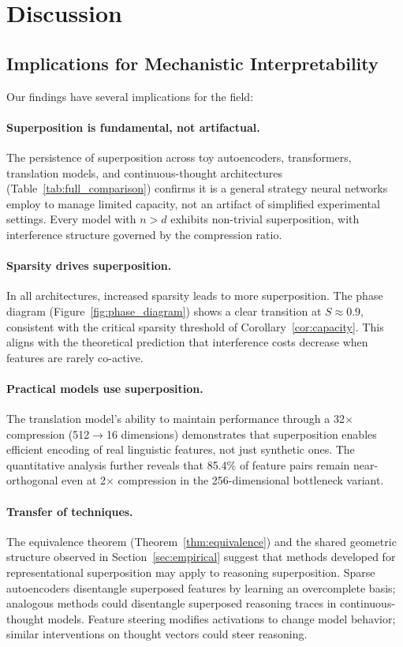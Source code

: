 \section{Discussion}
\label{sec:implications}

\subsection{Implications for Mechanistic Interpretability}

Our findings have several implications for the field:

\paragraph{Superposition is fundamental, not artifactual.} The persistence of superposition across toy autoencoders, transformers, translation models, and continuous-thought architectures (Table~\ref{tab:full_comparison}) confirms it is a general strategy neural networks employ to manage limited capacity, not an artifact of simplified experimental settings. Every model with $n > d$ exhibits non-trivial superposition, with interference structure governed by the compression ratio.

\paragraph{Sparsity drives superposition.} In all architectures, increased sparsity leads to more superposition. The phase diagram (Figure~\ref{fig:phase_diagram}) shows a clear transition at $S \approx 0.9$, consistent with the critical sparsity threshold of Corollary~\ref{cor:capacity}. This aligns with the theoretical prediction that interference costs decrease when features are rarely co-active.

\paragraph{Practical models use superposition.} The translation model's ability to maintain performance through a 32$\times$ compression (512$\rightarrow$16 dimensions) demonstrates that superposition enables efficient encoding of real linguistic features, not just synthetic ones. The quantitative analysis further reveals that 85.4\% of feature pairs remain near-orthogonal even at 2$\times$ compression in the 256-dimensional bottleneck variant.

\paragraph{Transfer of techniques.} The equivalence theorem (Theorem~\ref{thm:equivalence}) and the shared geometric structure observed in Section~\ref{sec:empirical} suggest that methods developed for representational superposition may apply to reasoning superposition. Sparse autoencoders \citep{bricken2023monosemanticity} disentangle superposed features by learning an overcomplete basis; analogous methods could disentangle superposed reasoning traces in continuous-thought models. Feature steering \citep{templeton2024scaling} modifies activations to change model behavior; similar interventions on thought vectors could steer reasoning.

